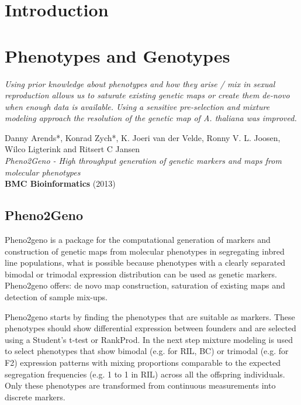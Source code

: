 \documentclass[8pt, twoside, a5paper]{report}
\newenvironment{myexampleblock}[1]{%
    \tcolorbox[beamer,%
    noparskip,breakable,
    colback=LightGreen,colframe=DarkGreen,%
    colbacklower=LimeGreen!75!LightGreen,%
    title=#1]}%
    {\endtcolorbox}
\newcommand{\authors}[1]{\small{#1}}
\newcommand{\bold}[1]{{\bfseries #1}}
\begin{document}
\tableofcontents

\chapter{Introduction}
\lipsum[1-3]

\chapter{Phenotypes and Genotypes}

\emph{Using prior knowledge about phenotypes and how they arise / mix in sexual reproduction allows us to saturate 
existing genetic maps or create them de-novo when enough data is available. Using a sensitive pre-selection 
and mixture modeling approach the resolution of the genetic map of A. thaliana was improved.}

\null
\vfill

\begin{myexampleblock}{Under review:}
  \authors{Danny Arends*, Konrad Zych*, K. Joeri van der Velde, Ronny V. L. Joosen, Wilco Ligterink and Ritsert C Jansen}\\
  \emph{Pheno2Geno - High throughput generation of genetic markers and maps from molecular phenotypes}\\
  \bold{BMC Bioinformatics} (2013)
\end{myexampleblock}
\newpage

\section{Pheno2Geno}
Pheno2geno is a package for the computational generation of markers and construction of genetic maps from 
molecular phenotypes in segregating inbred line populations, what is possible because phenotypes with a 
clearly separated bimodal or trimodal expression distribution can be used as genetic markers. Pheno2geno 
offers: de novo map construction, saturation of existing maps and detection of sample mix-ups. 

Pheno2geno starts by finding the phenotypes that are suitable as markers. These phenotypes should show 
differential expression between founders and are selected using a Student's t-test or RankProd. In the 
next step mixture modeling is used to select phenotypes that show bimodal (e.g. for RIL, BC) or trimodal 
(e.g. for F2) expression patterns with mixing proportions comparable to the expected segregation 
frequencies (e.g. 1 to 1 in RIL) across all the offspring individuals. Only these phenotypes are 
transformed from continuous measurements into discrete markers.
\end{document}
